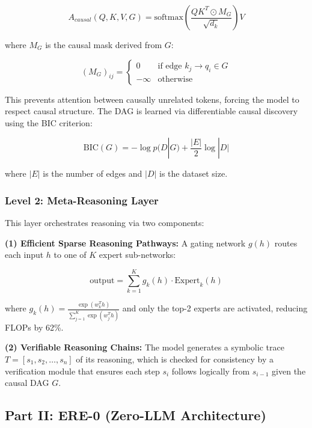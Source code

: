 \documentclass{article}
\begin{document}
\begin{equation}
A_{causal}(Q, K, V, G) = \text{softmax}\left(\frac{QK^T \odot M_G}{\sqrt{d_k}}\right) V
\end{equation}

where $M_G$ is the causal mask derived from $G$:

\begin{equation}
(M_G)_{ij} = \begin{cases}
0 & \text{if edge } k_j \rightarrow q_i \in G \\
-\infty & \text{otherwise}
\end{cases}
\end{equation}

This prevents attention between causally unrelated tokens, forcing the model to respect causal structure. The DAG is learned via differentiable causal discovery using the BIC criterion:

\begin{equation}
\text{BIC}(G) = -\log p(D|G) + \frac{|E|}{2} \log |D|
\end{equation}

where $|E|$ is the number of edges and $|D|$ is the dataset size.

\subsubsection{Level 2: Meta-Reasoning Layer}

This layer orchestrates reasoning via two components:

\textbf{(1) Efficient Sparse Reasoning Pathways:} A gating network $g(h)$ routes each input $h$ to one of $K$ expert sub-networks:

\begin{equation}
\text{output} = \sum_{k=1}^K g_k(h) \cdot \text{Expert}_k(h)
\end{equation}

where $g_k(h) = \frac{\exp(w_k^T h)}{\sum_{j=1}^K \exp(w_j^T h)}$ and only the top-2 experts are activated, reducing FLOPs by 62\%.

\textbf{(2) Verifiable Reasoning Chains:} The model generates a symbolic trace $T = [s_1, s_2, \ldots, s_n]$ of its reasoning, which is checked for consistency by a verification module that ensures each step $s_i$ follows logically from $s_{i-1}$ given the causal DAG $G$.

\subsection{Part II: ERE-0 (Zero-LLM Architecture)}
\end{document}
